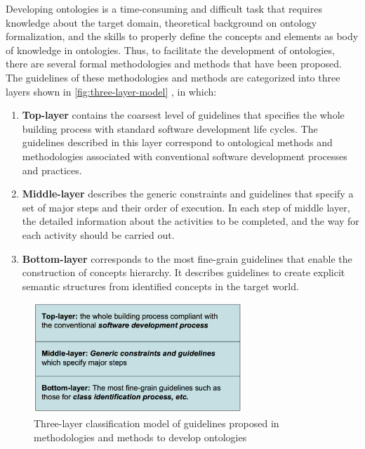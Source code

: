 Developing ontologies is a time-consuming and difficult task that requires knowledge about the target domain, theoretical background on ontology formalization, and the skills to properly define the concepts and elements as body of knowledge in ontologies. Thus, to facilitate the development of ontologies, there are several formal methodologies and methods that have been proposed. The guidelines of these methodologies and methods are categorized into three layers shown in \autoref{fig:three-layer-model} \cite{Mizoguchi2004}, in which:

\begin{enumerate}
\item \textbf{Top-layer} contains the coarsest level of guidelines that specifies the whole building process with standard software development life cycles. The guidelines described in this layer correspond to ontological methods and methodologies associated with conventional software development processes and practices.

\item \textbf{Middle-layer} describes the generic constraints and guidelines that specify a set of major steps and their order of execution. In each step of middle layer, the detailed information about the activities to be completed, and the way for each activity should be carried out. 

\item \textbf{Bottom-layer} corresponds to the most fine-grain guidelines that enable the construction of concepts hierarchy. It describes guidelines to create explicit semantic structures from identified concepts in the target world.
\end{enumerate}


\begin{figure}[htb]
 \caption{Three-layer classification model of guidelines proposed in methodologies and methods to develop ontologies}
 \label{fig:three-layer-model}
 \centering
 \includegraphics[width=0.7\textwidth]{images/chap-general-background/three-layer-model.png}
\end{figure}


